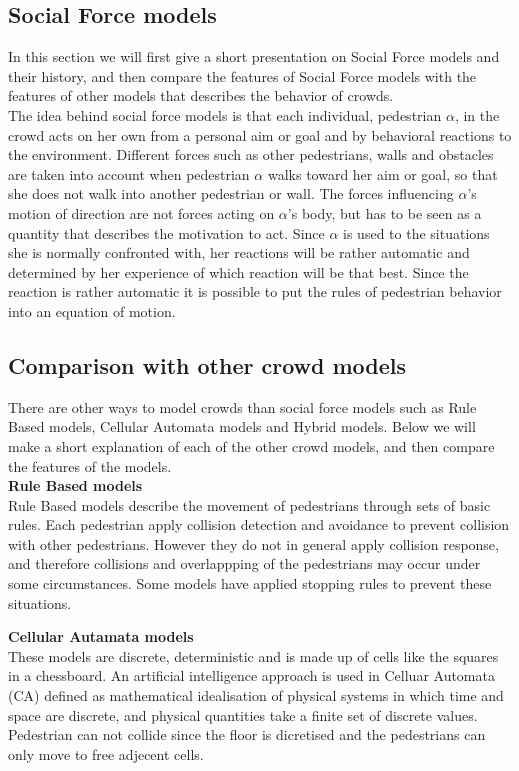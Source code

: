 \subsection{Social Force models}
In this section we will first give a short presentation on Social Force models and their history,
and then compare the features of Social Force models with the features of other models that describes
the behavior of crowds.
\\

The idea behind social force models is that each individual, pedestrian $\alpha$, in the crowd acts 
on her own from a personal aim or goal and by behavioral reactions to the environment. 
Different forces such as other pedestrians, walls and obstacles are taken into account 
when pedestrian $\alpha$ walks toward her aim or goal, so that she does not walk 
into another pedestrian or wall. The forces influencing $\alpha$'s motion 
of direction are not forces acting on $\alpha$'s body, but has to be seen as a quantity 
that describes the motivation to act. Since $\alpha$ is used to the situations 
she is normally confronted with, her reactions will be rather automatic and 
determined by her experience of which reaction will be that best. Since the reaction 
is rather automatic it is possible to put the rules of pedestrian behavior into an equation 
of motion.\cite{social-force}

\subsection{Comparison with other crowd models}
There are other ways to model crowds than social force models such as Rule Based models, 
Cellular Automata models and Hybrid models. Below we will make a short explanation of each of the 
other crowd models, and then compare the features of the models.\\												

\textbf{Rule Based models}\\
Rule Based models describe the movement of pedestrians through sets of basic rules. Each 
pedestrian apply collision detection and avoidance to prevent collision with other pedestrians. 
However they do not in general apply collision response, and therefore collisions and overlappping 
of the pedestrians may occur under some circumstances. Some models have applied stopping 
rules to prevent these situations.\cite{Comparison}

\textbf{Cellular Autamata models}\\
These models are discrete, deterministic and is made up of cells like the squares in a chessboard.
An artificial intelligence approach is used in Celluar Automata (CA) defined as mathematical idealisation 
of physical systems in which time and space are discrete, and physical quantities take a finite set of 
discrete values. Pedestrian can not collide since the floor is dicretised and the pedestrians can
only move to free adjecent cells.\cite{Comparison}

